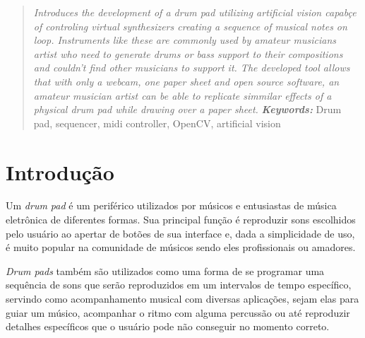\documentclass[12pt]{report}
\providecommand{\keywords}[1]{\textbf{\textit{Keywords: }} #1}
\begin{document}
\begin{abstract}
  {\it Introduces the development of a drum pad utilizing artificial vision capabçe of controling virtual synthesizers creating a sequence of musical notes on loop. Instruments like these are commonly used by amateur musicians artist who need to generate drums or bass support to their compositions and couldn't find other musicians to support it. The developed tool allows that with only a webcam, one paper sheet and open source software, an amateur musician artist can be able to replicate simmilar effects of a physical drum pad while drawing over a paper sheet.}
  \keywords{Drum pad, sequencer, midi controller, OpenCV, artificial vision}

\end{abstract}

\newpage



\listoffigures

\newpage


\tableofcontents




\newpage



\chapter{Introdução}
\label{cha:introducao}

Um {\it drum pad} é um periférico utilizados por músicos e entusiastas
de música eletrônica de diferentes formas. Sua principal função é
reproduzir sons escolhidos pelo usuário ao apertar de botões de sua
interface e, dada a simplicidade de uso, é muito popular na comunidade
de músicos sendo eles profissionais ou amadores.

{\it Drum pads} também são utilizados como uma forma de se programar
uma sequência de sons que serão reproduzidos em um intervalos de tempo
específico, servindo como acompanhamento musical com diversas
aplicações, sejam elas para guiar um músico, acompanhar o ritmo com
alguma percussão ou até reproduzir detalhes específicos que o usuário
pode não conseguir no momento correto.
\end{document}
